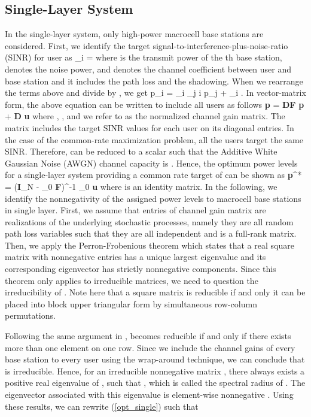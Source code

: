 \documentclass[conference,letterpaper,final,10pt]{IEEEtran}
\newcommand{\bea}{}
\begin{document}
\subsection{Single-Layer System}
In the single-layer system, only high-power macrocell base stations are considered. First, we identify the target signal-to-interference-plus-noise-ratio (SINR) for user  as \bea \gamma_i =
\eea where  is the transmit power of the th base
station,  denotes the noise power, and  denotes the channel coefficient between user  and base station  and it includes the path loss and the shadowing. When we rearrange the terms above and divide by
, we get \bea p_i = \gamma_i \sum\limits_{j \neq i}
p_j + \gamma_i .
\eea In vector-matrix form, the above equation can be written to
include all users as follows \bea \textbf{p} = \textbf{DF}
\textbf{p} + \textbf{D} \textbf{u} \label{p_dfp_u}\eea where , ,
 and we refer to  as the normalized channel gain matrix. The matrix  includes the target SINR values for each user on its diagonal entries. In the case of the common-rate maximization problem, all the users target the same SINR. Therefore,  can be reduced to a scalar  such that the Additive White Gaussian Noise (AWGN) channel capacity is . Hence, the optimum power levels for a single-layer system providing a common rate target of  can be shown as
\bea \textbf{p}^* = (\textbf{I}_N - \gamma_0 \textbf{F})^{-1} \gamma_0
\textbf{u} \label{opt_single}\eea
where  is an  identity matrix. In the following, we identify the nonnegativity of the assigned power levels to macrocell base stations  in single layer. First, we assume that entries of channel gain matrix  are realizations of the underlying stochastic processes, namely they are all random path loss variables such that they are all independent and  is a full-rank matrix. Then, we apply the Perron-Frobenious theorem \cite{TheoryOfMatrices} which states that a real square matrix with nonnegative entries has a unique largest eigenvalue and its corresponding eigenvector has strictly nonnegative components. Since this theorem only applies to irreducible matrices, we need to question the irreducibility of . Note here that a square matrix is reducible if and only it can be placed into block upper triangular form by simultaneous row-column permutations.

Following the same argument in \cite{Goodman},  becomes reducible if and only if there exists more than one  element on one row. Since we include the channel gains of every base station to every user using the wrap-around technique, we can conclude that  is irreducible. Hence, for an irreducible nonnegative matrix , there always exists a positive real eigenvalue of ,  such that , which is called the spectral radius of . The eigenvector associated with this eigenvalue is element-wise nonnegative \cite{TheoryOfMatrices}. Using these results, we can rewrite (\ref{opt_single}) such that
\end{document}
